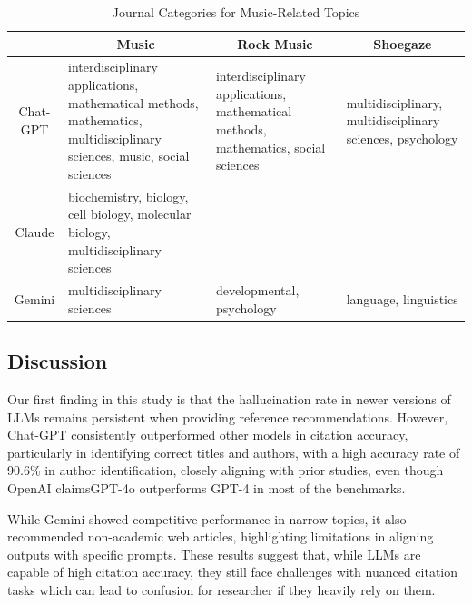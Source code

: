 \documentclass[runningheads]{llncs}
\begin{document}
\begin{table}[ht]
\centering
\scriptsize
\begin{tabular}{|c|p{3cm}|p{3cm}|p{3cm}|}
\hline
 & \multicolumn{1}{c|}{\textbf{Music}} & \multicolumn{1}{c|}{\textbf{Rock Music}} & \multicolumn{1}{c|}{\textbf{Shoegaze}} \\ \hline
Chat-GPT & interdisciplinary applications, mathematical methods, mathematics, multidisciplinary sciences, music, social sciences & interdisciplinary applications, mathematical methods, mathematics, social sciences & multidisciplinary, multidisciplinary sciences, psychology \\ \hline
Claude & biochemistry, biology, cell biology, molecular biology, multidisciplinary sciences &  &  \\ \hline
Gemini & multidisciplinary sciences & developmental, psychology & language, linguistics \\ \hline
\end{tabular}
\caption{Journal Categories for Music-Related Topics}
\label{tab:music_topics}
\end{table}


\subsection{Discussion}


Our first finding in this study is that the hallucination rate in newer versions of LLMs remains persistent when providing reference recommendations. However, Chat-GPT consistently outperformed other models in citation accuracy, particularly in identifying correct titles and authors, with a high accuracy rate of 90.6\% in author identification, closely aligning with prior studies, even though OpenAI claims\footnotemark[1] GPT-4o outperforms GPT-4 in most of the benchmarks. 


While Gemini showed competitive performance in narrow topics, it also recommended non-academic web articles, highlighting limitations in aligning outputs with specific prompts. These results suggest that, while LLMs are capable of high citation accuracy, they still face challenges with nuanced citation tasks which can lead to confusion for researcher if they heavily rely on them.

\end{document}
